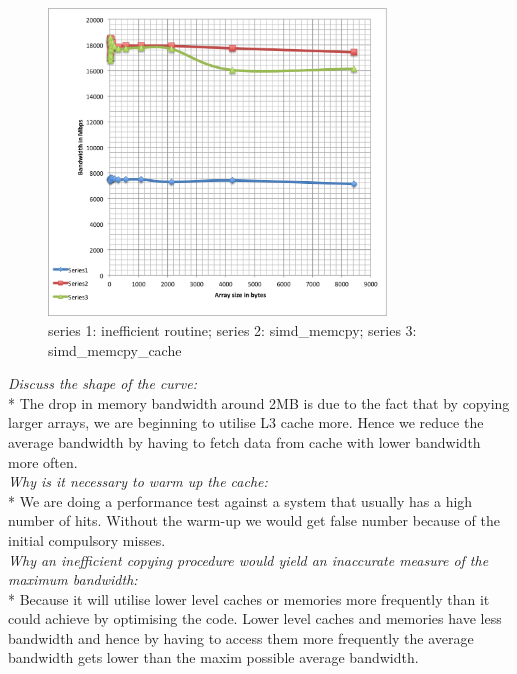 \documentclass[11pt,letter]{article}
\begin{document}
\begin{figure}[h]
\centering
\includegraphics[width=0.8\textwidth]{graph_mem.png}
\caption{series 1: inefficient routine; series 2: simd\_memcpy; series 3: simd\_memcpy\_cache}
\label{fig:awesome_image}
\end{figure}

\noindent\emph{Discuss the shape of the curve:}\\*
The drop in memory bandwidth around 2MB is due to the fact that by copying larger arrays, we are beginning to utilise L3 cache more. Hence we reduce the average bandwidth by having to fetch data from cache with lower bandwidth more often.\\[10pt]

\noindent\emph{Why is it necessary to warm up the cache:}\\*
We are doing a performance test against a system that usually has  a high number of hits. Without the warm-up we would get false number because of the initial compulsory misses.\\[10pt]

\noindent\emph{Why an inefficient  copying procedure would yield an inaccurate measure of the maximum bandwidth:}\\*
Because it will utilise lower level caches or memories more frequently than it could achieve by optimising the code. Lower level caches and memories have less bandwidth and hence by having to access them more frequently the average bandwidth gets lower than the maxim possible average bandwidth.
\end{document}
